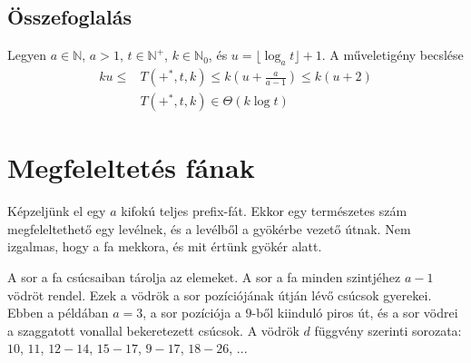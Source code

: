\documentclass{article}
\begin{document}
\subsection{Összefoglalás}

Legyen $a \in \mathbb{N}$, $a > 1$, $t \in \mathbb{N}^+$, $k \in \mathbb{N}_0$, és $u = \lfloor \log_{a}{t} \rfloor + 1$.
A műveletigény becslése
\begin{align*}
ku
\le &T(+^*, t, k)
\le k \left( u+\frac{a}{a-1} \right)
\le k(u+2)\\
&T(+^*, t, k) \in \Theta(k\log{t})
\end{align*}

\section{Megfeleltetés fának}

Képzeljünk el egy $a$ kifokú teljes prefix-fát.
Ekkor egy természetes szám megfeleltethető egy levélnek, és a levélből a gyökérbe vezető útnak.
Nem izgalmas, hogy a fa mekkora, és mit értünk gyökér alatt.

A sor a fa csúcsaiban tárolja az elemeket.
A sor a fa minden szintjéhez $a-1$ vödröt rendel.
Ezek a vödrök a sor pozíciójának útján lévő csúcsok gyerekei.
Ebben a példában $a=3$, a sor pozíciója a $9$-ből kiinduló piros út,
és a sor vödrei a szaggatott vonallal bekeretezett csúcsok. A vödrök $d$ függvény szerinti sorozata: $10$, $11$, $12-14$, $15-17$, $9-17$, $18-26$, ...

\end{document}
